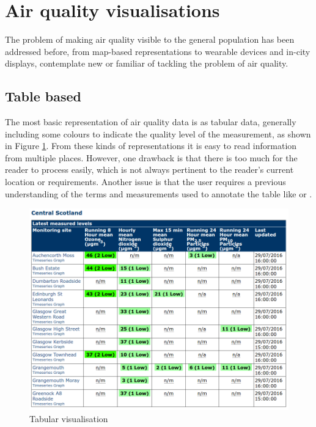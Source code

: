 \section{Air quality visualisations}
The problem of making air quality visible to the general population has been addressed before, from map-based representations to wearable devices and in-city displays, contemplate new or familiar of tackling the problem of air quality.

\subsection{Table based}
The most basic representation of air quality data is as tabular data, generally including some colours to indicate the quality level of the measurement, as shown in Figure \ref{fig:table_based_visualization}. From these kinds of representations it is easy to read information from multiple places. However, one drawback is that there is too much for the reader to process easily, which is not always pertinent to the reader's current location or requirements. Another issue is that the user requires a previous understanding of the terms and measurements used to annotate the table like  or . 

\begin{figure}[H]
\begin{adjustbox}{width=1\textwidth,center=\textwidth}
  \centering
  \includegraphics[scale=1]{images/tabular_data.png}
\end{adjustbox}
  \caption[Tabular visualisation]{Tabular visualisation \cite{DepartmentforEnvironment}}
  \label{fig:table_based_visualization}
\end{figure}

